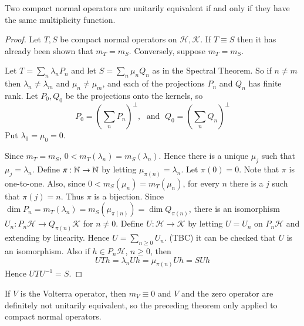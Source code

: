\begin{thm}
    Two compact normal operators are unitarily equivalent if and only if they have the same multiplicity function.
\end{thm}
\begin{proof}
    Let $T,S$ be compact normal operators on $\mathscr{H},\mathscr{K}$. If $T \equiv S$ then it has already been shown that $m_T = m_S$. Conversely, suppose $m_T = m_S$.

    Let $T = \sum_n\lambda_nP_n$ and let $S = \sum_n\mu_nQ_n$ as in the Spectral Theorem. So if $n \neq m$ then $\lambda_n \neq \lambda_m$ and $\mu_n\neq \mu_m$, and each of the projections $P_n$ and $Q_n$ has finite rank. Let $P_0,Q_0$ be the projections onto the kernels, so $$P_0 = \left(\sum_nP_n\right)^{\perp},\;\text{ and }\;Q_0 = \left(\sum_nQ_n\right)^{\perp}$$
    Put $\lambda_0 = \mu_0 = 0$.

    Since $m_T = m_S$, $0 < m_T(\lambda_n) = m_S(\lambda_n)$. Hence there is a unique $\mu_j$ such that $\mu_j = \lambda_n$. Define $\pi:\mathbb N\rightarrow \mathbb N$ by letting $\mu_{\pi(n)} = \lambda_n$. Let $\pi(0) = 0$. Note that $\pi$ is one-to-one. Also, since $0 < m_S(\mu_n) = m_T(\mu_n)$, for every $n$ there is a $j$ such that $\pi(j) = n$. Thus $\pi$ is a bijection. Since $\dim P_n = m_T(\lambda_n) = m_S(\mu_{\pi(n)}) = \dim Q_{\pi(n)}$, there is an isomorphism $U_n:P_n\mathscr{H}\rightarrow Q_{\pi(n)}\mathscr{K}$ for $n \neq 0$. Define $U:\mathscr{H}\rightarrow \mathscr{K}$ by letting $U = U_n$ on $P_n\mathscr{H}$ and extending by linearity. Hence $U = \sum_{n\geq 0}U_n$. (TBC) it can be checked that $U$ is an isomorphism. Also if $h \in P_n\mathscr{H}$, $n \geq 0$, then $$UTh = \lambda_nUh = \mu_{\pi(n)}Uh = SUh$$
    Hence $UTU^{-1} = S$.
\end{proof}

If $V$ is the Volterra operator, then $m_V \equiv 0$ and $V$ and the zero operator are definitely not unitarily equivalent, so the preceding theorem only applied to compact normal operators.

%
%
%


